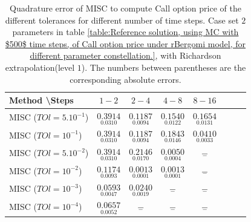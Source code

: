 \documentclass[11pt]{article}
\begin{document}
\begin{table}[h!]
	\centering
	\begin{tabular}{l*{6}{c}r}
		Method \textbackslash  Steps            & $1-2$ & $2-4$ & $4-8$ & $8-16$  \\
		\hline
			MISC ($TOl=5.10^{-1}$)  & $\underset{0.0310}{\mathbf{0.3914}}$ & $\underset{0.0094}{\mathbf{0.1187}}$ & $\underset{0.0122}{\mathbf{0.1540}}$ & $\underset{0.0131}{\mathbf{0.1654}}$ \\
		MISC ($TOl=10^{-1}$)  & $\underset{0.0310}{\mathbf{0.3914}}$ & $\underset{0.0094}{\mathbf{0.1187}}$ & $\underset{0.0146}{\mathbf{0.1843}}$ & $\underset{0.0033}{\mathbf{0.0410}}$  \\
				MISC ($TOl=5.10^{-2}$)  & $\underset{0.0310}{\mathbf{0.3914}}$ & $\underset{0.0170}{\mathbf{0.2146}}$ & $\underset{0.0004}{\mathbf{0.0050}}$ & $\underset{-}{\mathbf{-}}$  \\
		MISC ($TOl=10^{-2}$)  & $\underset{ 0.0093}{\mathbf{0.1174}}$ & $\underset{0.0001}{\mathbf{0.0013}}$ & $\underset{0.0001}{\mathbf{0.0013}}$ & $\underset{-}{\mathbf{ -}}$  \\
		MISC ($TOl=10^{-3}$)  & $\underset{  0.0047}{\mathbf{ 0.0593
		}}$ & $\underset{ 0.0019}{\mathbf{ 0.0240}}$ & $\underset{-}{\mathbf{-}}$ & $\underset{-}{\mathbf{-}}$  \\
	
		MISC ($TOl=10^{-4}$)  & $\underset{  0.0052}{\mathbf{ 0.0657
	}}$ & $\underset{-}{\mathbf{-}}$ & $\underset{-}{\mathbf{-}}$ & $\underset{-}{\mathbf{-}}$  \\
		
		\hline
	\end{tabular}
	\caption{Quadrature error of MISC to compute Call option price of the different tolerances for different number of time steps. Case set $2$ parameters in table \ref{table:Reference solution, using MC with $500$ time steps, of Call option price under rBergomi model, for different parameter constellation.}, with Richardson extrapolation(level $1$). The numbers between parentheses are the corresponding absolute errors.}
	\label{Quadrature error of MISC to compute Call option price of the different tolerances for different number of time steps. Case set $2$ parameters, with Richardson extrapolation(level $1$). The numbers between parentheses are the corresponding absolute errors.}
\end{table}
\end{document}
